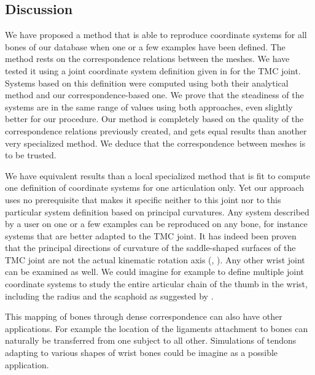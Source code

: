 \subsection{Discussion}
\label{Discussion}

We have proposed a method that is able to reproduce coordinate systems for all bones of our database when one or a few examples have been defined. The method rests on the correspondence relations between the meshes. We have tested it using a joint coordinate system definition given in \cite{halilaj_2013_thumb} for the TMC joint. Systems based on this definition were computed using both their analytical method and our correspondence-based one. We prove that the steadiness of the systems are in the same range of values using both approaches, even slightly better for our procedure. Our method is completely based on the quality of the correspondence relations previously created, and gets equal results than another very specialized method. We deduce that the correspondence between meshes is to be trusted. 

We have equivalent results than a local specialized method that is fit to compute one definition of coordinate systems for one articulation only. Yet our approach uses no prerequisite that makes it specific neither to this joint nor to this particular system definition based on principal curvatures. Any system described by a user on one or a few examples can be reproduced on any bone, for instance systems that are better adapted to the TMC joint. It has indeed been proven that the principal directions of curvature of the saddle-shaped surfaces of the TMC joint are not the actual kinematic rotation axis (\cite{hollister_1992_axes}, \cite{crisco_2015_vivo}). Any other wrist joint can be examined as well. We could imagine for example to define multiple joint coordinate systems to study the entire articular chain of the thumb in the wrist, including the radius and the scaphoid as suggested by \cite{dagostino_2017_vivo}.


This mapping of bones through dense correspondence can also have other applications. For example the location of the ligaments attachment to bones can naturally be transferred from one subject to all other. Simulations of tendons adapting to various shapes of wrist bones could be imagine as a possible application. 